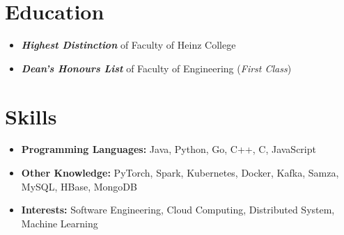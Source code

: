 \documentclass{resume}
\begin{document}



\section{Education}
\begin{itemize}[parsep=0.5ex]
  \item \textbf{\textit{Highest Distinction}} of Faculty of Heinz College
\end{itemize}
\begin{itemize}[parsep=0.5ex]
  \item \textbf{\textit{Dean's Honours List}} of Faculty of Engineering (\textit{First Class})
\end{itemize}

\section{Skills}
\begin{itemize}[parsep=0.5ex]
  \item \textbf{Programming Languages:} Java, Python, Go, C++, C, JavaScript
  \item \textbf{Other Knowledge:} PyTorch, Spark, Kubernetes, Docker, Kafka, Samza, MySQL, HBase, MongoDB
  \item \textbf{Interests:} Software Engineering, Cloud Computing, Distributed System, Machine Learning
\end{itemize}
\end{document}
